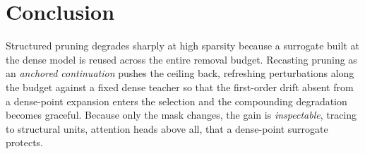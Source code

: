 \section{Conclusion}

Structured pruning degrades sharply at high sparsity because a surrogate built at the dense model is reused across the entire removal budget. Recasting pruning as an \emph{anchored continuation} pushes the ceiling back, refreshing perturbations along the budget against a fixed dense teacher so that the first-order drift absent from a dense-point expansion enters the selection and the compounding degradation becomes graceful. Because only the mask changes, the gain is \emph{inspectable}, tracing to structural units, attention heads above all, that a dense-point surrogate protects.
